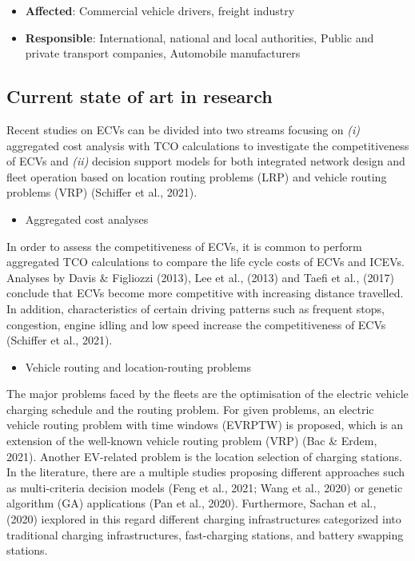 \documentclass[
]{book}
\providecommand{\tightlist}{%
  \setlength{\itemsep}{0pt}\setlength{\parskip}{0pt}}
\begin{document}
\begin{itemize}
\tightlist
\item
  \textbf{Affected}: Commercial vehicle drivers, freight industry
\item
  \textbf{Responsible}: International, national and local authorities, Public and private transport companies, Automobile manufacturers
\end{itemize}

\hypertarget{current-state-of-art-in-research-34}{%
\subsection*{Current state of art in research}\label{current-state-of-art-in-research-34}}

Recent studies on ECVs can be divided into two streams focusing on \emph{(i)} aggregated cost analysis with TCO calculations to investigate the competitiveness of ECVs and \emph{(ii)} decision support models for both integrated network design and fleet operation based on location routing problems (LRP) and vehicle routing problems (VRP) (Schiffer et al., 2021).

\begin{itemize}
\tightlist
\item
  Aggregated cost analyses
\end{itemize}

In order to assess the competitiveness of ECVs, it is common to perform aggregated TCO calculations to compare the life cycle costs of ECVs and ICEVs. Analyses by Davis \& Figliozzi (2013), Lee et al., (2013) and Taefi et al., (2017) conclude that ECVs become more competitive with increasing distance travelled. In addition, characteristics of certain driving patterns such as frequent stops, congestion, engine idling and low speed increase the competitiveness of ECVs (Schiffer et al., 2021).

\begin{itemize}
\tightlist
\item
  Vehicle routing and location-routing problems
\end{itemize}

The major problems faced by the fleets are the optimisation of the electric vehicle charging schedule and the routing problem. For given problems, an electric vehicle routing problem with time windows (EVRPTW) is proposed, which is an extension of the well-known vehicle routing problem (VRP) (Bac \& Erdem, 2021). Another EV-related problem is the location selection of charging stations. In the literature, there are a multiple studies proposing different approaches such as multi-criteria decision models (Feng et al., 2021; Wang et al., 2020) or genetic algorithm (GA) applications (Pan et al., 2020). Furthermore, Sachan et al., (2020) iexplored in this regard different charging infrastructures categorized into traditional charging infrastructures, fast-charging stations, and battery swapping stations.
\end{document}
